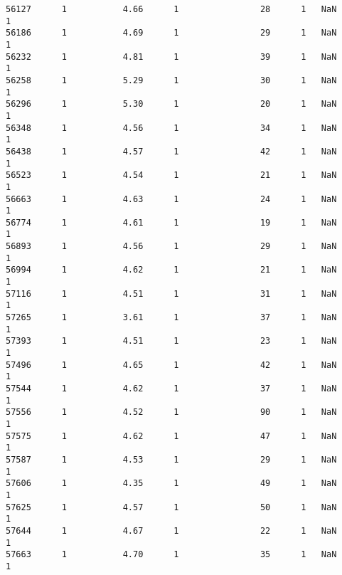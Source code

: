\documentclass[a4paper,11pt,final]{article}
\begin{document}
\begin{Verbatim}[commandchars=\\\{\},frame=leftline,fontsize=\small, xleftmargin=0.5em]
56127      1           4.66      1                28      1   NaN
1
56186      1           4.69      1                29      1   NaN
1
56232      1           4.81      1                39      1   NaN
1
56258      1           5.29      1                30      1   NaN
1
56296      1           5.30      1                20      1   NaN
1
56348      1           4.56      1                34      1   NaN
1
56438      1           4.57      1                42      1   NaN
1
56523      1           4.54      1                21      1   NaN
1
56663      1           4.63      1                24      1   NaN
1
56774      1           4.61      1                19      1   NaN
1
56893      1           4.56      1                29      1   NaN
1
56994      1           4.62      1                21      1   NaN
1
57116      1           4.51      1                31      1   NaN
1
57265      1           3.61      1                37      1   NaN
1
57393      1           4.51      1                23      1   NaN
1
57496      1           4.65      1                42      1   NaN
1
57544      1           4.62      1                37      1   NaN
1
57556      1           4.52      1                90      1   NaN
1
57575      1           4.62      1                47      1   NaN
1
57587      1           4.53      1                29      1   NaN
1
57606      1           4.35      1                49      1   NaN
1
57625      1           4.57      1                50      1   NaN
1
57644      1           4.67      1                22      1   NaN
1
57663      1           4.70      1                35      1   NaN
1


\end{Verbatim}
\end{document}
